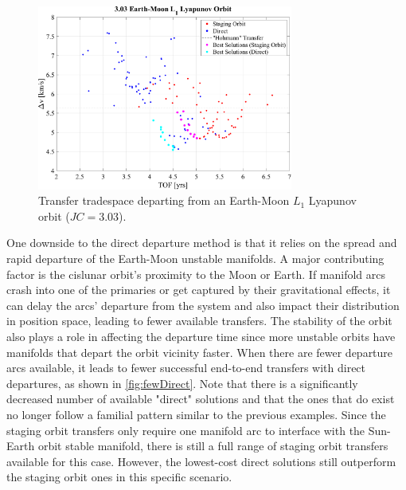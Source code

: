 \begin{figure}[ht]
    \centering
    \includegraphics[width=0.75\textwidth]{figures/TradeSpace_L1Lyapunov_3_03.pdf}
    \caption{Transfer tradespace departing from an Earth-Moon $L_{1}$ Lyapunov orbit ($JC=3.03$).}
    \label{fig:lowBoth}
\end{figure}

One downside to the direct departure method is that it relies on the spread and rapid departure of
the Earth-Moon unstable manifolds. A major contributing factor is the cislunar orbit's proximity to
the Moon or Earth. If manifold arcs crash into one of the primaries or get captured by their
gravitational effects, it can delay the arcs' departure from the system and also impact their
distribution in position space, leading to fewer available transfers. The stability of the orbit
also plays a role in affecting the departure time since more unstable orbits have manifolds that
depart the orbit vicinity faster. When there are fewer departure arcs available, it leads to fewer
successful end-to-end transfers with direct departures, as shown in \cref{fig:fewDirect}. Note that
there is a significantly decreased number of available "direct" solutions and that the ones that do
exist no longer follow a familial pattern similar to the previous examples. Since the staging orbit
transfers only require one manifold arc to interface with the Sun-Earth orbit stable manifold,
there is still a full range of staging orbit transfers available for this case. However, the
lowest-cost direct solutions still outperform the staging orbit ones in this specific scenario.

